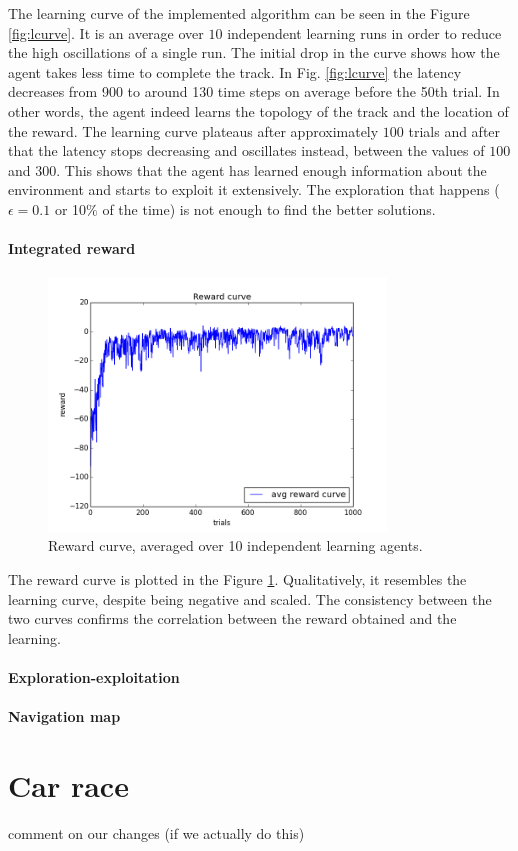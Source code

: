 The learning curve of the implemented algorithm can be seen in the
Figure \ref{fig:lcurve}. It is an average over $10$ independent learning runs in
order to reduce the high oscillations of a single run. The initial drop in the curve
shows how the agent takes less time to 
complete the track. In Fig. \ref{fig:lcurve} the latency decreases from 900 to around 130 time steps on average before the 50th trial. In other words, the agent indeed learns the topology of the track
and the location of the reward. The learning curve plateaus after
approximately $100$ trials and after that the latency stops decreasing and
oscillates instead, between the values of $100$ and $300$. This shows that the agent has learned enough information
about the environment and starts to exploit it extensively. The exploration that
happens ($\epsilon = 0.1$ or 10$\%$ of the time) is not enough to find the better solutions.

\paragraph{Integrated reward}

\begin{figure}[h!]
\centering
\includegraphics[width=0.8\textwidth]{figures/reward_curve.png}
\caption{Reward curve, averaged over 10 independent learning agents. \label{fig:rcurve}}
\end{figure}

The reward curve is plotted in the Figure \ref{fig:rcurve}. Qualitatively, it resembles
the learning curve, despite being negative and scaled. The consistency between
the two curves confirms the correlation between the reward obtained and the
learning.

\paragraph{Exploration-exploitation}



\paragraph{Navigation map}


\section{Car race}
comment on our changes (if we actually do this)
